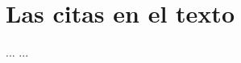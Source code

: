 \documentclass[12pt]{report}
\begin{document}
\section*{Las citas en el texto}
...\cite{conejo2011} ...\cite{galindo2009}


\end{document}
